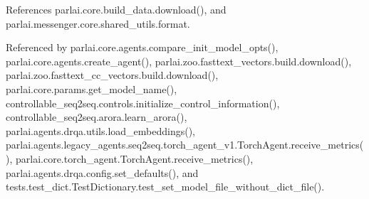 References parlai.\+core.\+build\+\_\+data.\+download(), and parlai.\+messenger.\+core.\+shared\+\_\+utils.\+format.



Referenced by parlai.\+core.\+agents.\+compare\+\_\+init\+\_\+model\+\_\+opts(), parlai.\+core.\+agents.\+create\+\_\+agent(), parlai.\+zoo.\+fasttext\+\_\+vectors.\+build.\+download(), parlai.\+zoo.\+fasttext\+\_\+cc\+\_\+vectors.\+build.\+download(), parlai.\+core.\+params.\+get\+\_\+model\+\_\+name(), controllable\+\_\+seq2seq.\+controls.\+initialize\+\_\+control\+\_\+information(), controllable\+\_\+seq2seq.\+arora.\+learn\+\_\+arora(), parlai.\+agents.\+drqa.\+utils.\+load\+\_\+embeddings(), parlai.\+agents.\+legacy\+\_\+agents.\+seq2seq.\+torch\+\_\+agent\+\_\+v1.\+Torch\+Agent.\+receive\+\_\+metrics(), parlai.\+core.\+torch\+\_\+agent.\+Torch\+Agent.\+receive\+\_\+metrics(), parlai.\+agents.\+drqa.\+config.\+set\+\_\+defaults(), and tests.\+test\+\_\+dict.\+Test\+Dictionary.\+test\+\_\+set\+\_\+model\+\_\+file\+\_\+without\+\_\+dict\+\_\+file().

